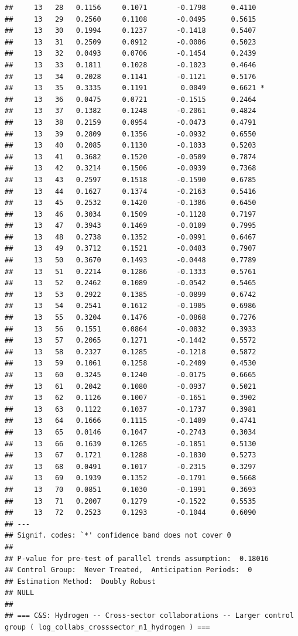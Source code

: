 \documentclass[
]{article}
\begin{document}
\begin{verbatim}
##     13   28   0.1156     0.1071       -0.1798      0.4110  
##     13   29   0.2560     0.1108       -0.0495      0.5615  
##     13   30   0.1994     0.1237       -0.1418      0.5407  
##     13   31   0.2509     0.0912       -0.0006      0.5023  
##     13   32   0.0493     0.0706       -0.1454      0.2439  
##     13   33   0.1811     0.1028       -0.1023      0.4646  
##     13   34   0.2028     0.1141       -0.1121      0.5176  
##     13   35   0.3335     0.1191        0.0049      0.6621 *
##     13   36   0.0475     0.0721       -0.1515      0.2464  
##     13   37   0.1382     0.1248       -0.2061      0.4824  
##     13   38   0.2159     0.0954       -0.0473      0.4791  
##     13   39   0.2809     0.1356       -0.0932      0.6550  
##     13   40   0.2085     0.1130       -0.1033      0.5203  
##     13   41   0.3682     0.1520       -0.0509      0.7874  
##     13   42   0.3214     0.1506       -0.0939      0.7368  
##     13   43   0.2597     0.1518       -0.1590      0.6785  
##     13   44   0.1627     0.1374       -0.2163      0.5416  
##     13   45   0.2532     0.1420       -0.1386      0.6450  
##     13   46   0.3034     0.1509       -0.1128      0.7197  
##     13   47   0.3943     0.1469       -0.0109      0.7995  
##     13   48   0.2738     0.1352       -0.0991      0.6467  
##     13   49   0.3712     0.1521       -0.0483      0.7907  
##     13   50   0.3670     0.1493       -0.0448      0.7789  
##     13   51   0.2214     0.1286       -0.1333      0.5761  
##     13   52   0.2462     0.1089       -0.0542      0.5465  
##     13   53   0.2922     0.1385       -0.0899      0.6742  
##     13   54   0.2541     0.1612       -0.1905      0.6986  
##     13   55   0.3204     0.1476       -0.0868      0.7276  
##     13   56   0.1551     0.0864       -0.0832      0.3933  
##     13   57   0.2065     0.1271       -0.1442      0.5572  
##     13   58   0.2327     0.1285       -0.1218      0.5872  
##     13   59   0.1061     0.1258       -0.2409      0.4530  
##     13   60   0.3245     0.1240       -0.0175      0.6665  
##     13   61   0.2042     0.1080       -0.0937      0.5021  
##     13   62   0.1126     0.1007       -0.1651      0.3902  
##     13   63   0.1122     0.1037       -0.1737      0.3981  
##     13   64   0.1666     0.1115       -0.1409      0.4741  
##     13   65   0.0146     0.1047       -0.2743      0.3034  
##     13   66   0.1639     0.1265       -0.1851      0.5130  
##     13   67   0.1721     0.1288       -0.1830      0.5273  
##     13   68   0.0491     0.1017       -0.2315      0.3297  
##     13   69   0.1939     0.1352       -0.1791      0.5668  
##     13   70   0.0851     0.1030       -0.1991      0.3693  
##     13   71   0.2007     0.1279       -0.1522      0.5535  
##     13   72   0.2523     0.1293       -0.1044      0.6090  
## ---
## Signif. codes: `*' confidence band does not cover 0
## 
## P-value for pre-test of parallel trends assumption:  0.18016
## Control Group:  Never Treated,  Anticipation Periods:  0
## Estimation Method:  Doubly Robust
## NULL
## 
## === C&S: Hydrogen -- Cross-sector collaborations -- Larger control group ( log_collabs_crosssector_n1_hydrogen ) ===
\end{verbatim}
\end{document}

